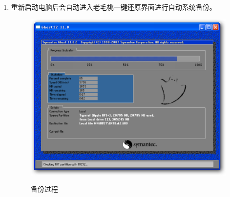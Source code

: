 \begin{itemize}
\begin{enumerate}
\item 重新启动电脑后会自动进入老毛桃一键还原界面进行自动系统备份。\\
\begin{figure}[!htbp]
	\centering
	\caption{备份过程}  
		\includegraphics[scale=0.35]{figs/win_lmt_backup_set.pdf}
    	\label{fig:win_lmt_backup_set}
\end{figure}

\end{enumerate}


\end{itemize}

